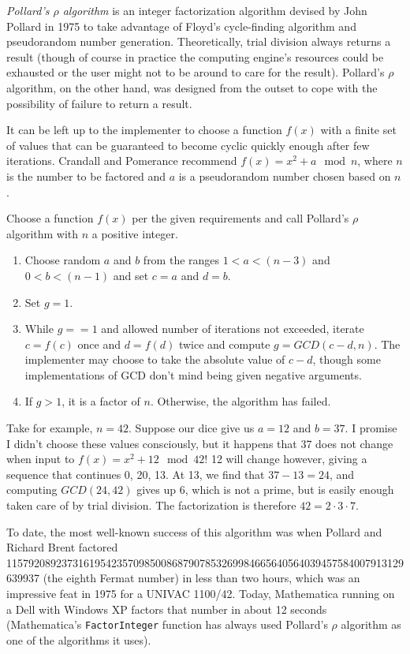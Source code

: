 \documentclass[12pt]{article}
\begin{document}
{\em Pollard's $\rho$ algorithm} is an integer factorization algorithm devised by John Pollard in 1975 to take advantage of Floyd's cycle-finding algorithm and pseudorandom number generation. Theoretically, trial division always returns a result (though of course in practice the computing engine's resources could be exhausted or the user might not to be around to care for the result). Pollard's $\rho$ algorithm, on the other hand, was designed from the outset to cope with the possibility of failure to return a result.

It can be left up to the implementer to choose a function $f(x)$ with a finite set of values that can be guaranteed to become cyclic quickly enough after few iterations. Crandall and Pomerance recommend $f(x) = x^2 + a \mod n$, where $n$ is the number to be factored and $a$ is a pseudorandom number chosen based on $n$.

Choose a function $f(x)$ per the given requirements and call Pollard's $\rho$ algorithm with  $n$ a positive integer.

\begin{enumerate}
\item Choose random $a$ and $b$ from the ranges $1 < a < (n - 3)$ and $0 < b < (n - 1)$ and set $c = a$ and $d = b$.
\item Set $g = 1$.
\item While $g == 1$ and allowed number of iterations not exceeded, iterate $c = f(c)$ once and $d = f(d)$ twice and compute $g = GCD(c - d, n)$. The implementer may choose to take the absolute value of $c - d$, though some implementations of GCD don't mind being given negative arguments.
\item If $g > 1$, it is a factor of $n$. Otherwise, the algorithm has failed.
\end{enumerate}

Take for example, $n = 42$. Suppose our dice give us $a = 12$ and $b = 37$. I promise I didn't choose these values consciously, but it happens that 37 does not change when input to $f(x) = x^2 + 12 \mod 42$! 12 will change however, giving a sequence that continues 0, 20, 13. At 13, we find that $37 - 13 = 24$, and computing $GCD(24, 42)$ gives up 6, which is not a prime, but is easily enough taken care of by trial division. The factorization is therefore $42 = 2 \cdot 3 \cdot 7$.

To date, the most well-known success of this algorithm was when Pollard and Richard Brent factored 115792089237316195423570985008687907853269984665640564039457584007913129639937 (the eighth Fermat number) in less than two hours, which was an impressive feat in 1975 for a UNIVAC 1100/42. Today, Mathematica running on a Dell with Windows XP factors that number in about 12 seconds (Mathematica's \verb=FactorInteger= function has always used Pollard's $\rho$ algorithm as one of the algorithms it uses).
\end{document}
